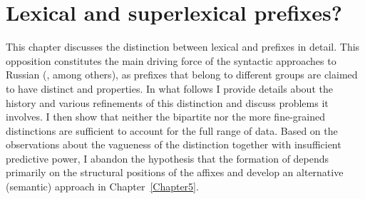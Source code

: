 
\chapter{Lexical and superlexical prefixes?} 
\label{Chapter4}

This chapter discusses the distinction between lexical and  prefixes in detail. This opposition constitutes the main driving force of the syntactic approaches to Russian  (\citealt{Ramchand:04, Svenonius:04b, Romanova:06}, among others), as prefixes that belong to different groups are claimed to have distinct  and properties. In what follows I provide details about the history and various refinements of this distinction and discuss problems it involves. I then show that neither the bipartite nor the more fine-grained distinctions are sufficient to account for the full range of data. Based on the observations about the vagueness of the distinction together with insufficient predictive power, I abandon the hypothesis that the formation of  depends primarily on the structural positions of the affixes and develop an alternative (semantic) approach in Chapter~\ref{Chapter5}.

